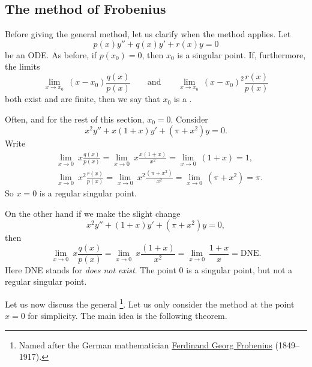 \documentclass[12pt]{book}
\begin{document}
\subsection{The method of Frobenius}

Before giving the general method, let us clarify when the method applies.
Let
\begin{equation*}
p(x) y'' + q(x) y' + r(x) y = 0
\end{equation*}
be an ODE.  As before, if $p(x_0) = 0$, then $x_0$ is a
singular point.  If, furthermore, the limits
\begin{equation*}
\lim_{x \to x_0} ~ (x-x_0) \frac{q(x)}{p(x)}
\qquad \text{and} \qquad
\lim_{x \to x_0} ~ (x-x_0)^2 \frac{r(x)}{p(x)}
\end{equation*}
both exist and are finite, then we say that $x_0$ is
a \emph{}.

\begin{example}
Often, and for the rest of this section, $x_0 = 0$.  Consider
\begin{equation*}
x^2y'' + x(1+x)y' + (\pi+x^2)y = 0 .
\end{equation*}
Write
\begin{align*}
& \lim_{x \to 0} ~x \frac{q(x)}{p(x)} = 
\lim_{x \to 0} ~x \frac{x(1+x)}{x^2} = \lim_{x \to 0} ~(1+x) = 1 ,
\\
& \lim_{x \to 0} ~x^2 \frac{r(x)}{p(x)} = 
\lim_{x \to 0} ~x^2 \frac{(\pi+x^2)}{x^2} = \lim_{x \to 0} ~(\pi+x^2) = \pi .
\end{align*}
So $x = 0$ is a regular singular point.

On the other hand if we make the slight change
\begin{equation*}
x^2y'' + (1+x)y' + (\pi+x^2)y = 0 ,
\end{equation*}
then
\begin{equation*}
\lim_{x \to 0} ~x \frac{q(x)}{p(x)} = 
\lim_{x \to 0} ~x \frac{(1+x)}{x^2} = \lim_{x \to 0} ~\frac{1+x}{x} =
\text{DNE}.
\end{equation*}
Here DNE stands for \emph{does not exist}.
The point $0$ is a singular point, but not a regular singular point.
\end{example}

Let us now discuss the general \emph{}%
\footnote{Named after the German mathematician
\href{http://en.wikipedia.org/wiki/Ferdinand_Georg_Frobenius}{Ferdinand
Georg Frobenius} (1849--1917).}.
Let us only consider the method at the point $x=0$ for simplicity.  The main
idea is the following theorem.
\end{document}
